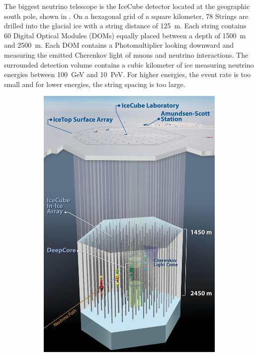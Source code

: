 The biggest neutrino telescope is the IceCube detector located at the geographic south pole, shown in .
On a hexagonal grid of a square kilometer, 78 Strings are drilled into the glacial ice with a string distance of \SI{125}{m}.
Each string contains 60 Digital Optical Modules (DOMs) equally placed between a depth of \SI{1500}{m} and \SI{2500}{m}.
Each DOM contains a Photomultiplier looking downward and measuring the emitted Cherenkov light of muons and neutrino interactions.
The surrounded detection volume contains a cubic kilometer of ice measuring neutrino energies between \SI{100}{GeV} and \SI{10}{PeV}.
For higher energies, the event rate is too small and for lower energies, the string spacing is too large.
\begin{figure}
    \centering
    \begin{subfigure}[t]{0.58\textwidth}
        \centering
        \includegraphics[width=\textwidth]{./images/icecube_detector.jpg}

\end{subfigure}
\end{figure}
